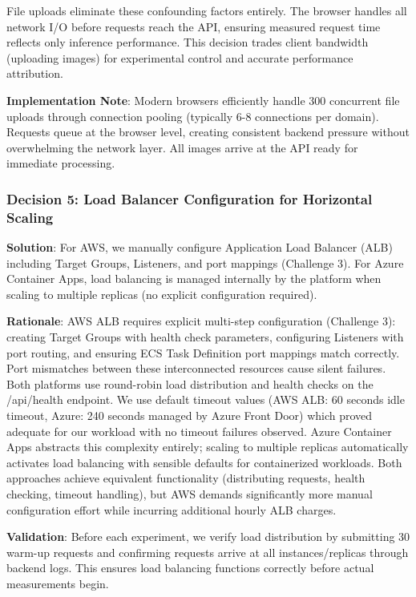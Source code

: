 File uploads eliminate these confounding factors entirely. The browser handles all network I/O before requests reach the API, ensuring measured request time reflects only inference performance. This decision trades client bandwidth (uploading images) for experimental control and accurate performance attribution.

\textbf{Implementation Note}: Modern browsers efficiently handle 300 concurrent file uploads through connection pooling (typically 6-8 connections per domain). Requests queue at the browser level, creating consistent backend pressure without overwhelming the network layer. All images arrive at the API ready for immediate processing.

\subsubsection{Decision 5: Load Balancer Configuration for Horizontal Scaling}

\textbf{Solution}: For AWS, we manually configure Application Load Balancer (ALB) including Target Groups, Listeners, and port mappings (Challenge 3). For Azure Container Apps, load balancing is managed internally by the platform when scaling to multiple replicas (no explicit configuration required).

\textbf{Rationale}: AWS ALB requires explicit multi-step configuration (Challenge 3): creating Target Groups with health check parameters, configuring Listeners with port routing, and ensuring ECS Task Definition port mappings match correctly. Port mismatches between these interconnected resources cause silent failures. Both platforms use round-robin load distribution and health checks on the /api/health endpoint. We use default timeout values (AWS ALB: 60 seconds idle timeout, Azure: 240 seconds managed by Azure Front Door) which proved adequate for our workload with no timeout failures observed. Azure Container Apps abstracts this complexity entirely; scaling to multiple replicas automatically activates load balancing with sensible defaults for containerized workloads. Both approaches achieve equivalent functionality (distributing requests, health checking, timeout handling), but AWS demands significantly more manual configuration effort while incurring additional hourly ALB charges.

\textbf{Validation}: Before each experiment, we verify load distribution by submitting 30 warm-up requests and confirming requests arrive at all instances/replicas through backend logs. This ensures load balancing functions correctly before actual measurements begin.

